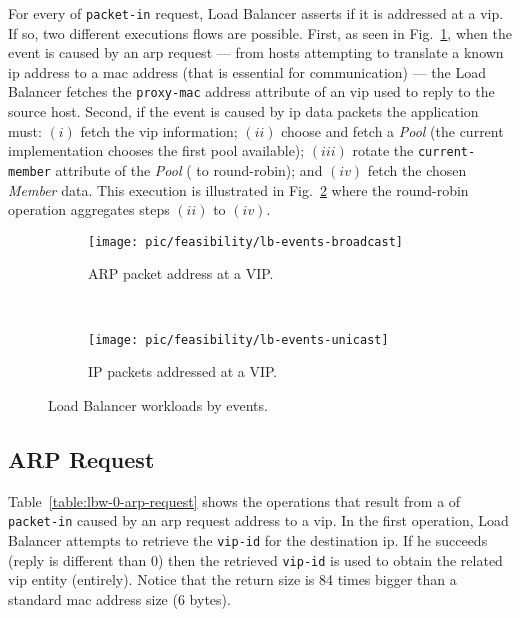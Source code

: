 \documentclass[12pt,openright,twoside]{report}
\begin{document}
For every \gls{of} \texttt{packet-in} request, Load Balancer asserts if it is addressed at a \gls{vip}. If so, two different executions flows are possible. First, as seen in Fig.~\ref{fig:lb:interaction:arp2Vip}, when the event is caused by an \gls{arp} request --- from hosts attempting to translate a known \gls{ip} address to a \gls{mac} address (that is essential for communication) ---   the Load Balancer fetches the \texttt{proxy-mac} address attribute of an \gls{vip} used to reply to the source host. Second, if the event is caused by \gls{ip} data packets the application must: $(i)$ fetch the \gls{vip} information; $(ii)$ choose and fetch a \emph{Pool} (the current implementation chooses the first pool available); $(iii)$ rotate the \texttt{current-member} attribute of the \emph{Pool}  ( to round-robin); and $(iv)$  fetch the chosen  \emph{Member}  data. This execution is illustrated in Fig.~\ref{fig:lb:interaction:ip2Vip} where the round-robin operation aggregates steps $(ii)$ to $(iv)$.  

\begin{figure}
  \centering
  \begin{subfigure}[b]{0.5\textwidth}
                \centering
                \texttt{[image: pic/feasibility/lb-events-broadcast]}
                \caption{ARP packet address at a VIP.}
                \label{fig:lb:interaction:arp2Vip}
        \end{subfigure}%
        ~
        \begin{subfigure}[b]{0.5\textwidth}
                \centering
                \texttt{[image: pic/feasibility/lb-events-unicast]}
                \caption{IP packets addressed at a VIP. }
                \label{fig:lb:interaction:ip2Vip}
        \end{subfigure}
        \caption[Load Balancer workloads]{Load Balancer workloads by events.}  
        \label{fig:lb:interaction}
\end{figure}



\subsection{ARP Request}
Table~\ref{table:lbw-0-arp-request}  shows the operations that result from a \gls{of} \texttt{packet-in} caused by an \gls{arp} request address to a \gls{vip}. 
In the first operation, Load Balancer attempts to retrieve the \texttt{vip-id} for the destination \gls{ip}. If he succeeds (reply is different than 0) then the retrieved \texttt{vip-id} is used to obtain the related \gls{vip} entity (entirely). Notice that the return size is 84 times bigger than a standard \gls{mac} address size (6 bytes). 
\end{document}
